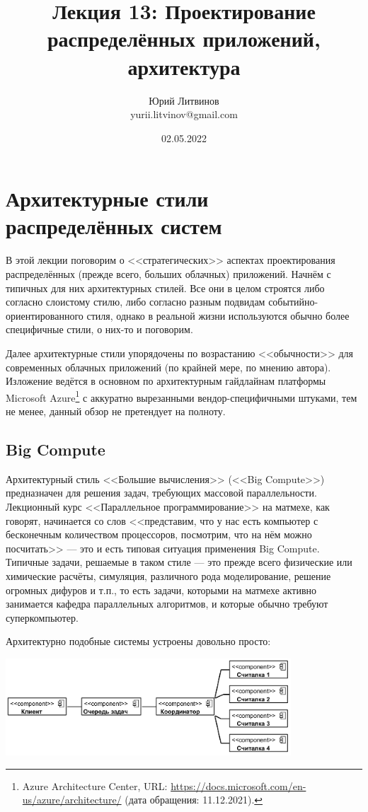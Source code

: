 \documentclass[a5paper]{article}
\title{Лекция 13: Проектирование распределённых приложений, архитектура}
\author{Юрий Литвинов\\\small{yurii.litvinov@gmail.com}}
\date{02.05.2022}
\begin{document}
\maketitle
\thispagestyle{empty}

\section{Архитектурные стили распределённых систем}

В этой лекции поговорим о <<стратегических>> аспектах проектирования распределённых (прежде всего, больших облачных) приложений. Начнём с типичных для них архитектурных стилей. Все они в целом строятся либо согласно слоистому стилю, либо согласно разным подвидам событийно-ориентированного стиля, однако в реальной жизни используются обычно более специфичные стили, о них-то и поговорим.

Далее архитектурные стили упорядочены по возрастанию <<обычности>> для современных облачных приложений (по крайней мере, по мнению автора). Изложение ведётся в основном по архитектурным гайдлайнам платформы Microsoft Azure\footnote{Azure Architecture Center, URL: \url{https://docs.microsoft.com/en-us/azure/architecture/} (дата обращения: 11.12.2021).} с аккуратно вырезанными вендор-специфичными штуками, тем не менее, данный обзор не претендует на полноту.

\subsection{Big Compute}

Архитектурный стиль <<Большие вычисления>> (<<Big Compute>>) предназначен для решения задач, требующих массовой параллельности. Лекционный курс <<Параллельное программирование>> на матмехе, как говорят, начинается со слов <<представим, что у нас есть компьютер с бесконечным количеством процессоров, посмотрим, что на нём можно посчитать>> --- это и есть типовая ситуация применения Big Compute. Типичные задачи, решаемые в таком стиле --- это прежде всего физические или химические расчёты, симуляция, различного рода моделирование, решение огромных дифуров и т.п., то есть задачи, которыми на матмехе активно занимается кафедра параллельных алгоритмов, и которые обычно требуют суперкомпьютер. 

Архитектурно подобные системы устроены довольно просто:

\begin{center}
    \includegraphics[width=0.8\textwidth]{bigCompute.png}
\end{center}
\end{document}
